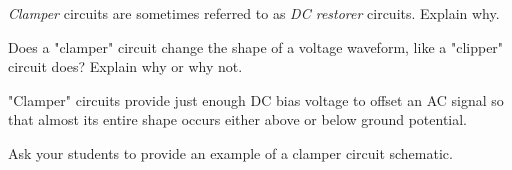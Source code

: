 

{\it Clamper} circuits are sometimes referred to as {\it DC restorer} circuits.  Explain why.

\vskip 10pt

Does a "clamper" circuit change the shape of a voltage waveform, like a "clipper" circuit does?  Explain why or why not.







"Clamper" circuits provide just enough DC bias voltage to offset an AC signal so that almost its entire shape occurs either above or below ground potential.







Ask your students to provide an example of a clamper circuit schematic.





